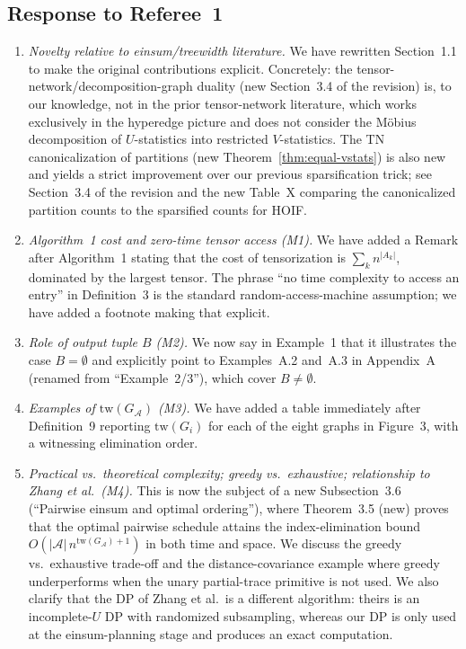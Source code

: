 \documentclass[11pt]{article}
\newcommand{\calA}{\mathcal{A}}
\newcommand{\tw}{\mathrm{tw}}
\theoremstyle{plain}
\theoremstyle{definition}
\begin{document}
\subsection*{Response to Referee~1}

\begin{enumerate}[leftmargin=2.4em,label=\textbf{(\arabic*)}]
\item \emph{Novelty relative to einsum/treewidth literature.}
We have rewritten Section~1.1 to make the original contributions
explicit.  Concretely: the tensor-network/decomposition-graph duality
(new Section~3.4 of the revision) is, to our knowledge, not in the
prior tensor-network literature, which works exclusively in the
hyperedge picture and does not consider the M\"obius decomposition of
$U$-statistics into restricted $V$-statistics.  The TN canonicalization
of partitions (new Theorem~\ref{thm:equal-vstats}) is also new and
yields a strict improvement over our previous sparsification trick;
see Section~3.4 of the revision and the new Table~X comparing the
canonicalized partition counts to the sparsified counts for HOIF.

\item \emph{Algorithm~1 cost and zero-time tensor access (M1).}
We have added a Remark after Algorithm~1 stating that the cost of
tensorization is $\sum_k n^{|A_k|}$, dominated by the largest tensor.
The phrase ``no time complexity to access an entry'' in Definition~3
is the standard random-access-machine assumption; we have added a
footnote making that explicit.

\item \emph{Role of output tuple $B$ (M2).}
We now say in Example~1 that it illustrates the case $B=\emptyset$ and
explicitly point to Examples~A.2 and~A.3 in Appendix~A (renamed from
``Example~2/3''), which cover $B\neq\emptyset$.

\item \emph{Examples of $\tw(G_\calA)$ (M3).}
We have added a table immediately after Definition~9 reporting
$\tw(G_i)$ for each of the eight graphs in Figure~3, with a witnessing
elimination order.

\item \emph{Practical vs.\ theoretical complexity; greedy vs.\ exhaustive;
relationship to Zhang et al.\ (M4).}
This is now the subject of a new Subsection~3.6 (``Pairwise einsum and
optimal ordering''), where Theorem~3.5 (new) proves that the optimal
pairwise schedule attains the index-elimination bound
$O(|\calA|\,n^{\tw(G_\calA)+1})$ in both time and space.  We discuss the
greedy vs.\ exhaustive trade-off and the distance-covariance example
where greedy underperforms when the unary partial-trace primitive is
not used.  We also clarify that the DP of Zhang et al.\ is a different
algorithm: theirs is an incomplete-$U$ DP with randomized subsampling,
whereas our DP is only used at the einsum-planning stage and produces
an exact computation.


\end{enumerate}
\end{document}
